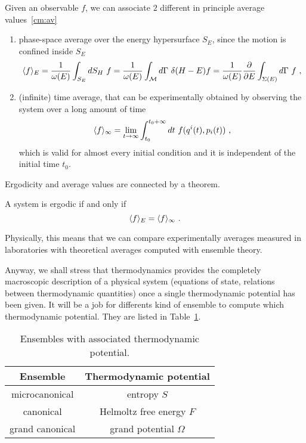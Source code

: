     Given an observable $f$, we can associate $2$ different in principle average values~\eqref{cm:av}
    \begin{enumerate}
        \item phase-space average over the energy hypersurface $S_E$, since the motion is confined inside $S_E$
            \begin{equation*}
                \langle f\rangle_E = \frac{1}{\omega(E)} \int_{S_E} dS_H ~ f = \frac{1}{\omega(E)} \int_{\mathcal M} d \Gamma ~ \delta (H - E) f = \frac{1}{\omega(E)} \frac{\partial}{\partial E} \int_{\Sigma(E)} d \Gamma ~ f ~, 
            \end{equation*}
        \item (infinite) time average, that can be experimentally obtained by observing the system over a long amount of time 
            \begin{equation*}
                \langle f\rangle_\infty = \lim_{t \rightarrow \infty} \int_{t_0}^{t_0 + \infty} dt ~ f(q^i(t), p_i(t)) ~, 
            \end{equation*}
            which is valid for almost every initial condition and it is independent of the initial time $t_0$.
    \end{enumerate}
    Ergodicity and average values are connected by a theorem.
    \begin{theorem}
        A system is ergodic if and only if 
        \begin{equation}\label{cm:erg}
            \langle f\rangle_E = \langle f\rangle_\infty ~.
        \end{equation}
    \end{theorem}
    Physically, this means that we can compare experimentally averages measured in laboratories with theoretical averages computed with ensemble theory. 

    Anyway, we shall stress that thermodynamics provides the completely macroscopic description of a physical system (equations of state, relations between thermodynamic quantities) once a single thermodynamic potential has been given. It will be a job for differents kind of ensemble to compute which thermodynamic potential. They are listed in Table~\ref{table:cm:1}.
    \begin{table}[h!]
        \centering
        \begin{tabular}{c | c }
            Ensemble & Thermodynamic potential \\
            \hline
            microcanonical & entropy $S$ \\ 
            canonical & Helmoltz free energy $F$ \\ 
            grand canonical & grand potential $\Omega$ \\ 
        \end{tabular}
        \caption{Ensembles with associated thermodynamic potential.}
        \label{table:cm:1}
    \end{table}
    
